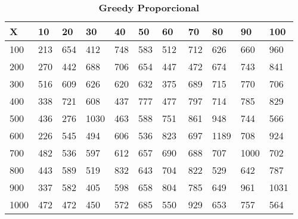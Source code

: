 \documentclass[10pt,letterpaper]{article}
\begin{document}
\begin{center}
\begin{table}\renewcommand{\arraystretch}{2.5}
\caption{\large \textbf{Greedy Proporcional}}
\centering
\begin{tabular} { |m{0.5cm}|m{1.3cm}|m{1.3cm}|m{1.3cm}|m{1.3cm}|m{1.3cm}|m{1.3cm}|m{1.3cm}|m{1.3cm}|m{1.3cm}|m{1.3cm}|} 
\hline
\rowcolor{Gray}
\centering \textbf{X} & \centering \textbf{10} & \centering \textbf{20} & \centering \textbf{30}\ & \centering \textbf{40} & \centering \textbf{50} & \centering \textbf{60}\ & \centering \textbf{70} & \centering \textbf{80} & \centering \textbf{90}\ & \textbf{100} \\\hline
\cellcolor{Gray}100 & \Large 213 & \Large 654 & \Large 412 & \Large 748 & \Large 583 & \Large 512 & \Large 712 & \Large 626 & \Large 660 & \Large 960 \\
\hline
\cellcolor{Gray}200 & \Large 270 & \Large 442 & \Large 688 & \Large 706 & \Large 654 & \Large 447 & \Large 472 & \Large 674 & \Large 743 & \Large 841 \\
\hline
\cellcolor{Gray}300 & \Large 516 & \Large 609 & \Large 626 & \Large 620 & \Large 632 & \Large 375 & \Large 689 & \Large 715 & \Large 770 & \Large 706 \\
\hline
\cellcolor{Gray}400 & \Large 338 & \Large 721 & \Large 608 & \Large 437 & \Large 777 & \Large 477 & \Large 797 & \Large 714 & \Large 785 & \Large 829 \\
\hline
\cellcolor{Gray}500 & \Large 436 & \Large 276 & \Large 1030 & \Large 463 & \Large 588 & \Large 751 & \Large 861 & \Large 948 & \Large 744 & \Large 566 \\
\hline
\cellcolor{Gray}600 & \Large 226 & \Large 545 & \Large 494 & \Large 606 & \Large 536 & \Large 823 & \Large 697 & \Large 1189 & \Large 708 & \Large 924 \\
\hline
\cellcolor{Gray}700 & \Large 482 & \Large 536 & \Large 597 & \Large 612 & \Large 657 & \Large 690 & \Large 688 & \Large 707 & \Large 1000 & \Large 702 \\
\hline
\cellcolor{Gray}800 & \Large 443 & \Large 589 & \Large 519 & \Large 832 & \Large 643 & \Large 704 & \Large 822 & \Large 529 & \Large 642 & \Large 787 \\
\hline
\cellcolor{Gray}900 & \Large 337 & \Large 582 & \Large 405 & \Large 598 & \Large 658 & \Large 804 & \Large 785 & \Large 649 & \Large 961 & \Large 1031 \\
\hline
\cellcolor{Gray}1000 & \Large 472 & \Large 472 & \Large 450 & \Large 572 & \Large 685 & \Large 550 & \Large 929 & \Large 653 & \Large 757 & \Large 564 \\
\hline
\end{tabular} \\
\end{table}
\end{center}
\end{document}
